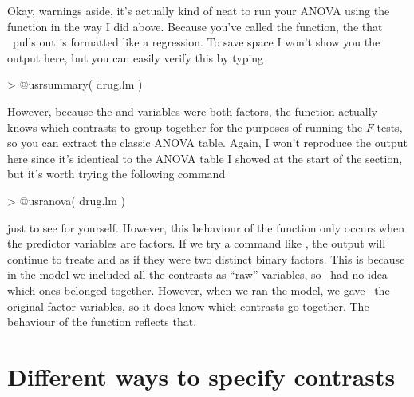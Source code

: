 Okay, warnings aside, it's actually kind of neat to run your ANOVA using the  function in the way I did above. Because you've called the  function, the  that \R\ pulls out is formatted like a regression. To save space I won't show you the output here, but you can easily verify this by typing
\begin{rblock1}
> @usr{summary( drug.lm )}
\end{rblock1}
However, because the  and  variables were both factors, the  function actually knows which contrasts to group together for the purposes of running the $F$-tests, so you can extract the classic ANOVA table. Again, I won't reproduce the output here since it's identical to the ANOVA table I showed at the start of the section, but it's worth trying the following command
\begin{rblock1}
> @usr{anova( drug.lm )}
\end{rblock1}
just to see for yourself. However, this behaviour of the  function only occurs when the predictor variables are factors. If we try a command like , the output will continue to treate  and  as if they were two distinct binary factors. This is because in the  model we included all the contrasts as ``raw'' variables, so \R\ had no idea which ones belonged together. However, when we ran the  model, we gave \R\ the original factor variables, so it does know which contrasts go together. The behaviour of the  function reflects that.

\section{Different ways to specify contrasts\label{sec:contrasts}}

